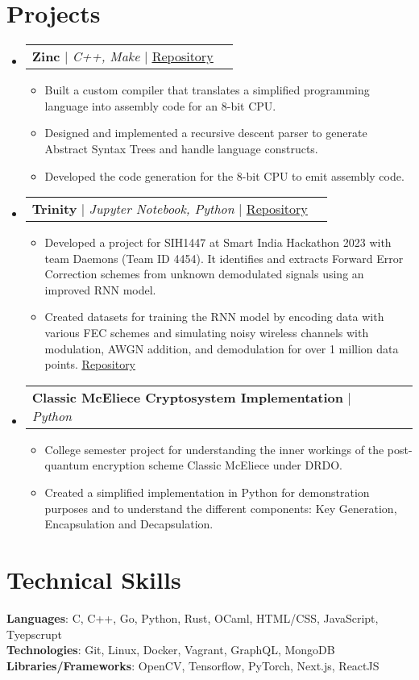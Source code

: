 \documentclass[letterpaper,11pt]{article}
\makeatletter
\newcommand{\resumeItem}[1]{
  \item\small{
    {#1 \vspace{-2pt}}
  }
}
\newcommand{\resumeProjectHeading}[2]{
    \item
    \begin{tabular*}{1.001\textwidth}{l@{\extracolsep{\fill}}r}
      \small#1 & \textbf{\small #2}\\
    \end{tabular*}\vspace{-7pt}
}
\newcommand{\resumeSubHeadingListStart}{\begin{itemize}[leftmargin=0.0in, label={}]}
\newcommand{\resumeSubHeadingListEnd}{\end{itemize}}
\newcommand{\resumeItemListStart}{\begin{itemize}}
\newcommand{\resumeItemListEnd}{\end{itemize}\vspace{-5pt}}
\makeatother
\begin{document}
\section{Projects}
    \vspace{-5pt}
    \resumeSubHeadingListStart
      \resumeProjectHeading
          {\textbf{Zinc} $|$ \emph{C++, Make} $|$ \href{https://github.com/MashyBasker/zinc}{\underline{Repository}}}{}
          \resumeItemListStart
            \resumeItem{Built a custom compiler that translates a simplified programming language into assembly code for an 8-bit CPU.}
            \resumeItem{Designed and implemented a recursive descent parser to generate Abstract Syntax Trees and handle language constructs.}
            \resumeItem{Developed the code generation for the 8-bit CPU to emit assembly code.}
          \resumeItemListEnd
          \vspace{-13pt}
      \resumeProjectHeading
          {\textbf{Trinity} $|$ \emph{Jupyter Notebook, Python} $|$ \href{https://github.com/MashyBasker/Trinity}{\underline{Repository}}}{}
          \resumeItemListStart
            \resumeItem{Developed a project for SIH1447 at Smart India Hackathon 2023 with team Daemons (Team ID 4454). It identifies and extracts Forward Error Correction schemes from unknown demodulated signals using an improved RNN model.}
            \resumeItem{Created datasets for training the RNN model by encoding data with various FEC schemes and simulating noisy wireless channels with modulation, AWGN addition, and demodulation for over 1 million data points. \href{https://github.com/FEC-SIH-23/data}{\underline{Repository}}}
          \resumeItemListEnd 
          \vspace{-13pt}
          \resumeProjectHeading
          {\textbf{Classic McEliece Cryptosystem Implementation} $|$ \emph{Python}}{}
          \resumeItemListStart
            \resumeItem{College semester project for understanding the inner workings of the post-quantum encryption scheme Classic McEliece under DRDO.}
            \resumeItem{Created a simplified implementation in Python for demonstration purposes and to understand the different components: Key Generation, Encapsulation and Decapsulation.}
          \resumeItemListEnd 
    \resumeSubHeadingListEnd
\vspace{-15pt}
%
\vspace{5pt}
\section{Technical Skills}
\begin{itemize}[leftmargin=0.15in, label={}]
    \small{\item{
        \textbf{Languages}{: C, C++, Go, Python, Rust, OCaml, HTML/CSS, JavaScript, Tyepscrupt} \\
        \textbf{Technologies}{: Git, Linux, Docker, Vagrant, GraphQL, MongoDB} \\
        \textbf{Libraries/Frameworks}{: OpenCV, Tensorflow, PyTorch, Next.js, ReactJS}
        }}
    \end{itemize}
    \vspace{-16pt}
\end{document}
